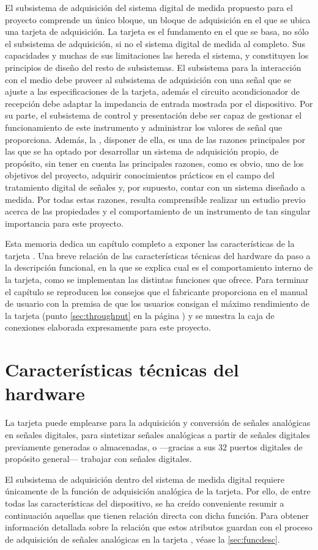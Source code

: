 El subsistema de adquisición del sistema digital de medida propuesto para el proyecto comprende un único bloque, un bloque de adquisición en el que se ubica una tarjeta de adquisición. La tarjeta \kpci{} es el fundamento en el que se basa, no sólo el subsistema de adquisición, si no el sistema digital de medida al completo. Sus capacidades y muchas de sus limitaciones las hereda el sistema, y constituyen los principios de diseño del resto de subsistemas. El subsistema para la interacción con el medio debe proveer al subsistema de adquisición con una señal que se ajuste a las especificaciones de la tarjeta, además el circuito acondicionador de recepción debe adaptar la impedancia de entrada mostrada por el dispositivo. Por su parte, el subsistema de control y presentación debe ser capaz de gestionar el funcionamiento de este instrumento y administrar los valores de señal que proporciona. Además, la \kpci{}, disponer de ella, es una de las razones principales por las que se ha optado por desarrollar un sistema de adquisición propio, de propósito, sin tener en cuenta las principales razones, como es obvio, uno de los objetivos del proyecto, adquirir conocimientos prácticos en el campo del tratamiento digital de señales y, por supuesto, contar con un sistema diseñado a medida. Por todas estas razones, resulta comprensible realizar un estudio previo acerca de las propiedades y el comportamiento de un instrumento de tan singular importancia para este proyecto.\par
Esta memoria dedica un capítulo completo a exponer las características de la tarjeta \kpci{}. Una breve relación de las características técnicas del hardware da paso a la descripción funcional, en la que se explica cual es el comportamiento interno de la tarjeta, como se implementan las distintas funciones que ofrece. Para terminar el capítulo se reproducen los consejos que el fabricante proporciona en el manual de usuario con la premisa de que los usuarios consigan el máximo rendimiento de la tarjeta (punto \ref{sec:throughput} en la página \pageref{sec:throughput}) y se muestra la caja de conexiones elaborada expresamente para este proyecto.


\section{Características técnicas del hardware}\label{sec:technical}

La tarjeta \kpci{} puede emplearse para la adquisición y conversión de señales analógicas en señales digitales, para sintetizar señales analógicas a partir de señales digitales previamente generadas o almacenadas, o ---gracias a sus 32 puertos digitales de propósito general--- trabajar con señales digitales.\par
El subsistema de adquisición dentro del sistema de medida digital requiere únicamente de la función de adquisición analógica de la tarjeta. Por ello, de entre todas las características del dispositivo, se ha creído conveniente resumir a continuación aquellas que tienen relación directa con dicha función. Para obtener información detallada sobre la relación que estos atributos guardan con el proceso de adquisición de señales analógicas en la tarjeta \kpci{}, véase la \vref{sec:funcdesc}.

